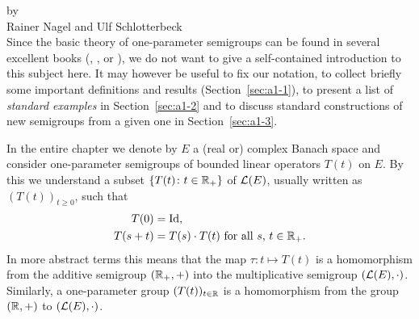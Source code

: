 \label{chap:a1}%
\thispagestyle{empty}
{\Large
\vspace*{-.75cm}
by \\[.25em]
Rainer Nagel and Ulf Schlotterbeck 
\vspace{.75cm}
\\
}
Since the basic theory of one-parameter semigroups can be found in several excellent books (\eg \textcite{davies:1980}, \textcite{goldstein:1985a}, \textcite{pazy:1983} or \textcite{hillephillips:1957}), we do not want to give a self-contained introduction to this subject here.
It may however be useful to fix our notation, to collect briefly some important definitions and results (Section~\ref{sec:a1-1}), to present a list of \emph{standard examples} in Section~\ref{sec:a1-2} %
and to discuss standard constructions of new semigroups from a given one in Section~\ref{sec:a1-3}.

In the entire chapter we denote by $E$ a (real or) complex Banach space and consider one-parameter semigroups of bounded linear operators $T(t)$ on $E$.
By this we understand a subset $\{T(t) \colon  t \in \mathbb{R}_{+}\}$ of\/ $\mathcal{L}(E)$, usually written as $(T(t))_{t\geq0}$, such that
\begin{align*}
	T(0) &= \operatorname{Id}, \\
	T(s+t) &= T(s) \cdot T(t) \text{ for all $s$, $t \in \mathbb{R}_{+}$.}
\end{align*}
In more abstract terms this means that the map $ \tau \colon t \mapsto T(t)$ is a homomorphism from the additive semigroup $(\mathbb{R}_{+},+)$ into the multiplicative semigroup $(\mathcal{L}(E),\cdot)$.
Similarly, a one-parameter group $(T(t))_{t\in\mathbb{R}}$ is a homomorphism from the group  $(\mathbb{R},+)$ to $(\mathcal{L}(E),\cdot)$.
